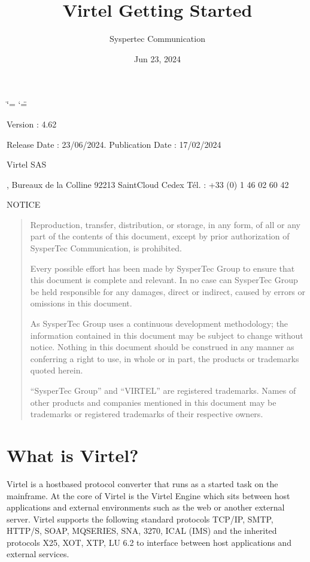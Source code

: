 \documentclass[letterpaper,10pt,english]{sphinxmanual}
\title{Virtel Getting Started}
\date{Jun 23, 2024}
\author{Syspertec Communication}
\begin{document}
\ifdefined\shorthandoff
  \ifnum\catcode`\=\string=\active\shorthandoff{=}\fi
  \ifnum\catcode`\"=\active{}\fi
\fi

\pagestyle{empty}
\sphinxmaketitle
\pagestyle{plain}
\sphinxtableofcontents
\pagestyle{normal}
\label{\detokenize{Getting_Started::doc}}


\sphinxAtStartPar
{}

\sphinxAtStartPar
Version : 4.62

\sphinxAtStartPar
Release Date : 23/06/2024. Publication Date : 17/02/2024

\sphinxAtStartPar
Virtel SAS

, Bureaux de la Colline 92213 Saint\sphinxhyphen{}Cloud Cedex Tél. : +33 (0) 1 46 02 60 42

\sphinxAtStartPar
{}

\sphinxAtStartPar
NOTICE
\begin{quote}

\sphinxAtStartPar
Reproduction, transfer, distribution, or storage, in any form, of all or any part of
the contents of this document, except by prior authorization of SysperTec
Communication, is prohibited.

\sphinxAtStartPar
Every possible effort has been made by SysperTec Group to ensure that this document
is complete and relevant. In no case can SysperTec Group be held responsible for
any damages, direct or indirect, caused by errors or omissions in this document.

\sphinxAtStartPar
As SysperTec Group uses a continuous development methodology; the information
contained in this document may be subject to change without notice. Nothing in this
document should be construed in any manner as conferring a right to use, in whole or in
part, the products or trademarks quoted herein.

\sphinxAtStartPar
“SysperTec Group” and “VIRTEL” are registered trademarks. Names of other products
and companies mentioned in this document may be trademarks or registered trademarks of
their respective owners.
\end{quote}


\chapter{What is Virtel?}
\label{\detokenize{Getting_Started:what-is-virtel}}
\sphinxAtStartPar
Virtel is a host\sphinxhyphen{}based protocol converter that runs as a started task on the mainframe. At the core of Virtel is the Virtel Engine which sits between host applications and external environments such as the web or another external server. Virtel supports the following standard protocols \sphinxhyphen{} TCP/IP, SMTP, HTTP/S, SOAP, MQ\sphinxhyphen{}SERIES, SNA, 3270, ICAL (IMS) and the inherited protocols \sphinxhyphen{} X25, XOT, XTP, LU 6.2 to interface between host applications and external services.
\end{document}
